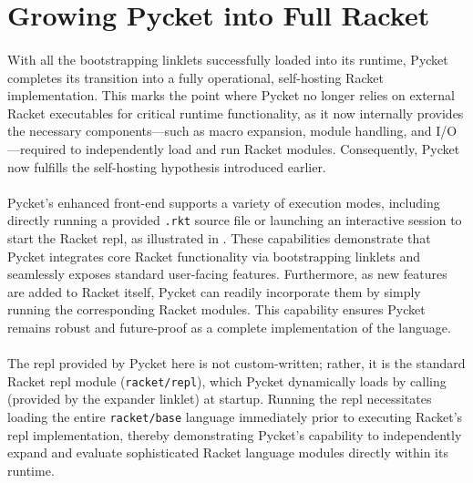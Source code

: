 	\section[\texorpdfstring{Growing Pycket into Full Racket}{Pycket as Full Racket}]{Growing Pycket into Full Racket}


		\paragraph{}%
			With all the bootstrapping linklets successfully loaded into its runtime, Pycket completes its transition into a fully operational, self-hosting Racket implementation. This marks the point where Pycket no longer relies on external Racket executables for critical runtime functionality, as it now internally provides the necessary components—such as macro expansion, module handling, and I/O—required to independently load and run Racket modules. Consequently, Pycket now fulfills the self-hosting hypothesis introduced earlier.

		\paragraph{}%
			Pycket's enhanced front-end supports a variety of execution modes, including directly running a provided \texttt{.rkt} source file or launching an interactive session to start the Racket \gls{repl}, as illustrated in . These capabilities demonstrate that Pycket integrates core Racket functionality via bootstrapping linklets and seamlessly exposes standard user-facing features. Furthermore, as new features are added to Racket itself, Pycket can readily incorporate them by simply running the corresponding Racket modules. This capability ensures Pycket remains robust and future-proof as a complete implementation of the language.

		\paragraph{}%
			The \gls{repl} provided by Pycket here is not custom-written; rather, it is the standard Racket \gls{repl} module (\texttt{racket/repl}), which Pycket dynamically loads by calling  (provided by the expander linklet) at startup. Running the \gls{repl} necessitates loading the entire \texttt{racket/base} language immediately prior to executing Racket’s \gls{repl} implementation, thereby demonstrating Pycket's capability to independently expand and evaluate sophisticated Racket language modules directly within its runtime.

